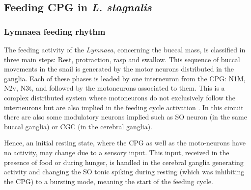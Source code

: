 

\subsection{Feeding CPG in \textit{L. stagnalis}}
%


\subsubsection{Lymnaea feeding rhythm}

The feeding activity of the \textit{Lymnaea}, concerning the buccal mass, is classified in three main steps: Rest, protraction, rasp and swallow. This sequence of buccal movements in the snail is generated by the motor neurons distributed in the ganglia. Each of these phases is leaded by one interneuron from the CPG: N1M, N2v, N3t, and followed by the motoneurons associated to them. This is a complex distributed system where motoneurons do not exclusively follow the interneurons but are also implied in the feeding cycle activation \cite{staras_pattern-generating_1998}. In this circuit there are also some modulatory neurons implied such as SO neuron (in the same buccal ganglia) or CGC (in the cerebral ganglia). 

Hence, an initial resting state, where the CPG as well as the moto-neurons have no activity, may change due to a sensory input. This input, received in the presence of food or during hunger, is handled in the cerebral ganglia generating activity and changing the SO tonic spiking during resting (which was inhibiting the CPG) to a bursting mode, meaning the start of the feeding cycle.


